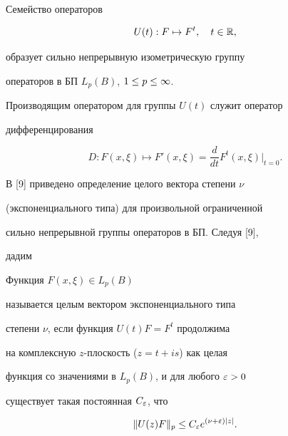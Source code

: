 \begin{prop}


Семейство операторов


$$


U(t):F\mapsto F^t,\quad t\in\Ra,


$$


образует сильно непрерывную изометрическую группу


операторов в БП $L_p(B)$, $1\le p\le\infty$.


\end{prop}





Производящим оператором для группы $U(t)$ служит оператор


дифференцирования


$$


D:F(x,\xi)\mapsto F'(x,\xi)=\frac d{dt}F^t(x,\xi)


\Big|_{t=0}.


$$





В [9] приведено определение целого вектора степени $\nu$


(экспоненциального типа) для произвольной ограниченной


сильно непрерывной группы операторов в БП. Следуя [9],


дадим





\begin{defn}


Функция $F(x,\xi)\in L_p(B)$


называется целым вектором экспоненциального типа


степени $\nu$, если функция $U(t)F=F^t$ продолжима


на комплексную $z$-плоскость ($z=t+is$) как целая


функция со значениями в $L_p(B)$, и для любого $\varepsilon>0$


существует такая постоянная $C_\varepsilon$, что


\begin{equation}


\|U(z)F\|_p\le C_\ep e^{(\nu+\ep)|z|}.


\end{equation}


\end{defn}





